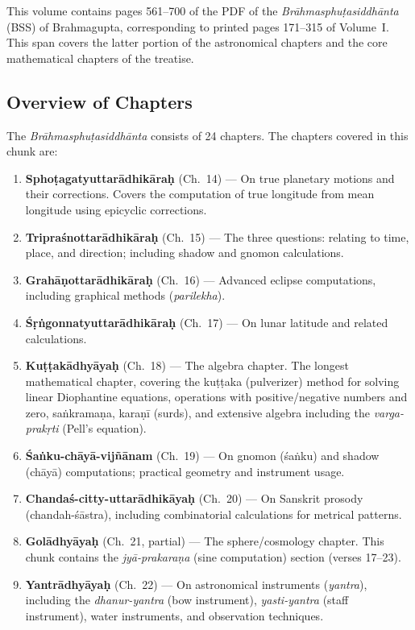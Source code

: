 \documentclass[11pt,a4paper]{article}
\begin{document}
This volume contains pages 561–700 of the PDF of the
\textit{Brāhmasphuṭasiddhānta} (BSS) of Brahmagupta, corresponding to
printed pages 171–315 of Volume~I. This span covers the latter portion
of the astronomical chapters and the core mathematical chapters of the
treatise.

\subsection*{Overview of Chapters}

The \textit{Brāhmasphuṭasiddhānta} consists of 24 chapters. The
chapters covered in this chunk are:

\begin{enumerate}[label=\textbf{Ch. \Roman*:}, wide=0pt]
  \item \textbf{Sphoṭagatyuttarādhikāraḥ} (Ch.~14) — On true planetary
    motions and their corrections. Covers the computation of true
    longitude from mean longitude using epicyclic corrections.
  \item \textbf{Tripraśnottarādhikāraḥ} (Ch.~15) — The three questions:
    relating to time, place, and direction; including shadow and gnomon
    calculations.
  \item \textbf{Grahāṇottarādhikāraḥ} (Ch.~16) — Advanced eclipse
    computations, including graphical methods (\textit{parilekha}).
  \item \textbf{Śṛṅgonnatyuttarādhikāraḥ} (Ch.~17) — On lunar latitude
    and related calculations.
  \item \textbf{Kuṭṭakādhyāyaḥ} (Ch.~18) — The algebra chapter. The
    longest mathematical chapter, covering the kuṭṭaka (pulverizer)
    method for solving linear Diophantine equations, operations with
    positive/negative numbers and zero, saṅkramaṇa, karaṇī (surds),
    and extensive algebra including the \textit{varga-prakṛti} (Pell's
    equation).
  \item \textbf{Śaṅku-chāyā-vijñānam} (Ch.~19) — On gnomon (śaṅku) and
    shadow (chāyā) computations; practical geometry and instrument
    usage.
  \item \textbf{Chandaś-citty-uttarādhikāyaḥ} (Ch.~20) — On Sanskrit
    prosody (chandah-śāstra), including combinatorial calculations for
    metrical patterns.
  \item \textbf{Golādhyāyaḥ} (Ch.~21, partial) — The sphere/cosmology
    chapter. This chunk contains the \textit{jyā-prakaraṇa} (sine
    computation) section (verses 17–23).
  \item \textbf{Yantrādhyāyaḥ} (Ch.~22) — On astronomical instruments
    (\textit{yantra}), including the \textit{dhanur-yantra} (bow
    instrument), \textit{yasti-yantra} (staff instrument), water
    instruments, and observation techniques.
\end{enumerate}
\end{document}
